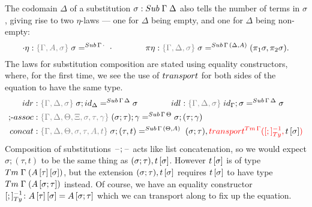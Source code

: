 \documentclass[a4paper,UKenglish,numberwithinsect,cleveref,thm-restate]{lipics-v2021}
\begin{document}
The codomain $\Delta$ of a substitution $\sigma:\Sub\;\Gamma\;\Delta$ also tells the number of terms in $\sigma$, giving rise to two $\eta$-laws --- one for $\Delta$ being empty, and one for $\Delta$ being non-empty:
\[
  \emptyctx\eta : \implicit{\Gamma, A, \sigma}\; \sigma        =^{\Sub\,\Gamma\,\emptyctx} \; \emptysub
  \qquad\qquad
  \pi\eta       : \implicit{\Gamma, \Delta, \sigma}\; \sigma   =^{\Sub\,\Gamma\,(\Delta, A)} (\pi_1 \sigma, \pi_2 \sigma).
\]
%
The laws for substitution composition are stated using equality constructors, where, for the first time, we see the use of $\transp$ for both sides of the equation to have the same type.
\begin{align*}
  \mathsf{idr}    & : \implicit{\Gamma, \Delta, \sigma}\; {\sigma ; \idS_{\Delta}} =^{\Sub\,\Gamma\,\Delta} {\sigma}
                                                                                    \qquad\qquad
  \mathsf{idl}    : \implicit{\Gamma, \Delta, \sigma}\; {\idS_{\Gamma} ; \sigma} =^{\Sub\,\Gamma\,\Delta} {\sigma} \\
  \text{;-}\mathsf{assoc} & : \implicit{\Gamma, \Delta, \Theta, \Xi, \sigma, \tau, \gamma}\; (\sigma ; \tau) ; \gamma =^{\Sub\,\Gamma\,\Theta} \sigma ; (\tau ; \gamma) \\
  \mathsf{concat} & : \implicit{\Gamma, \Delta, \Theta, \sigma, \tau, A, t} \; \sigma ; (\tau , t) =^{\Sub\,\Gamma\,(\Theta, A)} \; (\sigma ; \tau) , \alert{\transfib{\Tm\,\Gamma}{[;]_{\Ty}^{-1}}{\color{black}\sub{t}{\sigma}}}
\end{align*}
%
Composition of substitutions $\mathord{\hspace{1pt}\text{--}\hspace{1pt}};\mathord{\hspace{1pt}\text{--}\hspace{1pt}}$ acts like list concatenation, so
we would expect $\sigma; (\tau, t)$ to be the same thing as $(\sigma; \tau), {t}\,[\sigma]$. However ${t}\,[\sigma]$ is of type $\Tm\;\Gamma\;(\sub{\sub{A}{\tau}}{\sigma})$, but the extension $(\sigma; \tau), {t}\,[\sigma]$ requires ${t}\,[\sigma]$ to have type $\Tm\;\Gamma\;(\sub{A}{\sigma; \tau})$ instead. Of course, we have an equality constructor $[;]_{\Ty}^{-1}\colon \sub{\sub{A}{\tau}}{\sigma} = \sub{A}{\sigma;\tau}$ which we can transport along to fix up the equation.
\end{document}
